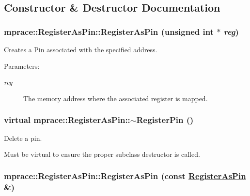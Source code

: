 \subsection{Constructor \& Destructor Documentation}
\hypertarget{classmprace_1_1RegisterAsPin_a0}{
\subsubsection[RegisterAsPin]{\setlength{\rightskip}{0pt plus 5cm}mprace::Register\-As\-Pin::Register\-As\-Pin (unsigned int $\ast$ {\em reg})}}
\label{classmprace_1_1RegisterAsPin_a0}


Creates a \hyperlink{classmprace_1_1Pin}{Pin} associated with the specified address. 

\begin{Desc}
\item[Parameters:]
\begin{description}
\item[{\em reg}]The memory address where the associated register is mapped.\end{description}
\end{Desc}
\hypertarget{classmprace_1_1RegisterAsPin_a1}{
\subsubsection[$\sim$RegisterPin]{\setlength{\rightskip}{0pt plus 5cm}virtual mprace::Register\-As\-Pin::$\sim$Register\-Pin ()}}
\label{classmprace_1_1RegisterAsPin_a1}


Delete a pin. 

Must be virtual to ensure the proper subclass destructor is called.\hypertarget{classmprace_1_1RegisterAsPin_b0}{
\subsubsection[RegisterAsPin]{\setlength{\rightskip}{0pt plus 5cm}mprace::Register\-As\-Pin::Register\-As\-Pin (const \hyperlink{classmprace_1_1RegisterAsPin}{Register\-As\-Pin} \&)}}
\label{classmprace_1_1RegisterAsPin_b0}


